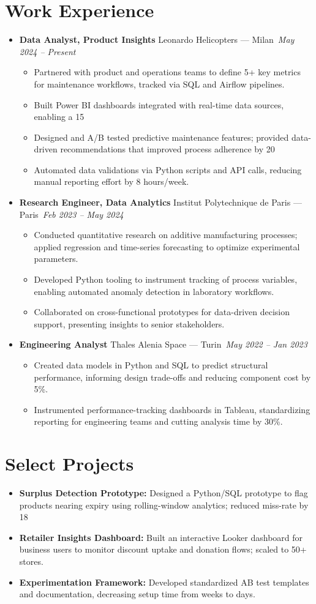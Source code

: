 \documentclass[letterpaper,10.5pt]{article}
\newcommand{\resumeEntry}[4]{
\item\textbf{#1} \hfill #2\
\textit{#3} \hfill \textit{#4}
}
\newcommand{\resumeDescription}[1]{
\vspace{-3pt}\begin{itemize}[leftmargin=0.2in]
#1
\end{itemize}
}
\begin{document}
\section*{Work Experience}
\begin{itemize}[leftmargin=0.2in]
\resumeEntry{Data Analyst, Product Insights}{Leonardo Helicopters — Milan}{May 2024 -- Present}{}
\resumeDescription{
\item Partnered with product and operations teams to define 5+ key metrics for maintenance workflows, tracked via SQL and Airflow pipelines.
\item Built Power BI dashboards integrated with real-time data sources, enabling a 15%
\item Designed and A/B tested predictive maintenance features; provided data-driven recommendations that improved process adherence by 20%
\item Automated data validations via Python scripts and API calls, reducing manual reporting effort by 8 hours/week.
}
\resumeEntry{Research Engineer, Data Analytics}{Institut Polytechnique de Paris — Paris}{Feb 2023 -- May 2024}{}
\resumeDescription{
    \item Conducted quantitative research on additive manufacturing processes; applied regression and time-series forecasting to optimize experimental parameters.
    \item Developed Python tooling to instrument tracking of process variables, enabling automated anomaly detection in laboratory workflows.
    \item Collaborated on cross-functional prototypes for data-driven decision support, presenting insights to senior stakeholders.
}

\resumeEntry{Engineering Analyst}{Thales Alenia Space — Turin}{May 2022 -- Jan 2023}{}
\resumeDescription{
    \item Created data models in Python and SQL to predict structural performance, informing design trade-offs and reducing component cost by 5\%.
    \item Instrumented performance-tracking dashboards in Tableau, standardizing reporting for engineering teams and cutting analysis time by 30\%.
}
\end{itemize}

\section*{Select Projects}
\begin{itemize}[leftmargin=0.2in]
\item \textbf{Surplus Detection Prototype:} Designed a Python/SQL prototype to flag products nearing expiry using rolling-window analytics; reduced miss-rate by 18%
\item \textbf{Retailer Insights Dashboard:} Built an interactive Looker dashboard for business users to monitor discount uptake and donation flows; scaled to 50+ stores.
\item \textbf{Experimentation Framework:} Developed standardized AB test templates and documentation, decreasing setup time from weeks to days.
\end{itemize}
\end{document}
